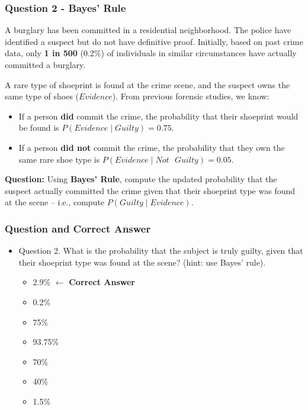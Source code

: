 \documentclass[handout]{beamer} %
\begin{document}
\begin{frame} \frametitle{Question 2 - Bayes’ Rule}
    A burglary has been committed in a residential neighborhood. The police have identified a suspect but do not have definitive proof. Initially, based on past crime data, only \textbf{1 in 500} (0.2\%) of individuals in similar circumstances have actually committed a burglary.
    
    A rare type of shoeprint is found at the crime scene, and the suspect owns the same type of shoes ($Evidence$). From previous forensic studies, we know: 
    \begin{itemize}
        \item If a person \textbf{did} commit the crime, the probability that their shoeprint would be found is $P(Evidence \mid Guilty) = 0.75$.
        \item If a person \textbf{did not} commit the crime, the probability that they own the same rare shoe type is $P(Evidence \mid Not\text{ } Guilty) = 0.05$.
    \end{itemize}
    
    \textbf{Question:} Using \textbf{Bayes’ Rule}, compute the updated probability that the suspect actually committed the crime given that their shoeprint type was found at the scene -- i.e., compute $ P(Guilty \mid Evidence) $.
\end{frame}

\begin{frame} \frametitle{Question and Correct Answer}

\begin{itemize}
    \item Question 2. What is the probability that the subject is truly guilty, given that their shoeprint type was found at the scene? (hint: use Bayes' rule).
    \begin{itemize}
        \item 2.9\% $\leftarrow$ \textbf{Correct Answer}
        \item 0.2\%
        \item 75\%
        \item 93.75\%
        \item 70\%
        \item 40\%
        \item 1.5\%
    \end{itemize}
\end{itemize}

\end{frame} %
\end{document}
